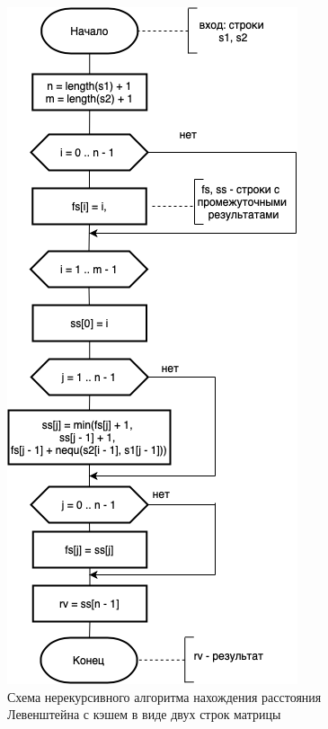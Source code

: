 \documentclass{report}
\begin{document}
\begin{figure}[h!p]\label{levTwoRows}
	\centering
	\includegraphics[scale = 0.7]{levRows.drawio.png}
	\caption{Схема нерекурсивного алгоритма нахождения расстояния Левенштейна с кэшем в виде двух строк матрицы}
	\label{fig:mpr3}
\end{figure}
\end{document}
